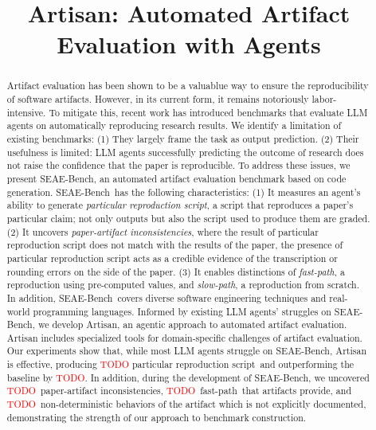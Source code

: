 \documentclass[acmsmall,screen,review,anonymous]{acmart}
\begin{document}
\newcommand\benchmark{SEAE-Bench}
\newcommand\approach{Artisan}

\newcommand\goodscript{particular reproduction script}
\newcommand\newbug{paper-artifact inconsistencies}
\newcommand\fastpath{fast-path}
\newcommand\slowpath{slow-path}

\newcommand\papersetsize{28}
\newcommand\tablesetsize{101} 

\newcommand\todo[1]{\textcolor{red}{TODO: #1}}
\newcommand\evalgoodscript{\textcolor{red}{TODO}}
\newcommand\evalgoodscriptoutperform{\textcolor{red}{TODO}}
\newcommand\nondetsize{\textcolor{red}{TODO}}
\newcommand\inconsistenciessize{\textcolor{red}{TODO}}
\newcommand\fastpathsize{\textcolor{red}{TODO}}

\title{Artisan: Automated Artifact Evaluation with Agents}
\begin{abstract}
Artifact evaluation has been shown to be a valuablue way to ensure the reproducibility of software artifacts.
However, in its current form, it remains notoriously labor-intensive.
To mitigate this, recent work has introduced benchmarks that evaluate LLM agents on automatically reproducing research results.
We identify a limitation of existing benchmarks:
(1) They largely frame the task as output prediction.
(2) Their usefulness is limited: LLM agents successfully predicting the outcome of research does not raise the confidence that the paper is reproducible.
To address these issues, we present \benchmark, an automated artifact evaluation benchmark based on code generation.
\benchmark~has the following characteristics:
(1) It measures an agent’s ability to generate \emph{\goodscript{}}, a script that reproduces a paper’s particular claim; not only outputs but also the script used to produce them are graded.
(2) It uncovers \emph{\newbug{}}, where the result of \goodscript{} does not match with the results of the paper, the presence of \goodscript{} acts as a credible evidence of the transcription or rounding errors on the side of the paper.
(3) It enables distinctions of \emph{\fastpath{}}, a reproduction using pre-computed values, and \emph{\slowpath{}}, a reproduction from scratch.
In addition, \benchmark~covers diverse software engineering techniques and real-world programming languages.
Informed by existing LLM agents’ struggles on \benchmark, we develop Artisan, an agentic approach to automated artifact evaluation.
Artisan includes specialized tools for domain-specific challenges of artifact evaluation.
Our experiments show that, while most LLM agents struggle on \benchmark, Artisan is effective, producing \evalgoodscript{} \goodscript{}~and outperforming the baseline by \evalgoodscriptoutperform{}.
In addition, during the development of \benchmark, we uncovered \inconsistenciessize~\newbug{}, \fastpathsize~\fastpath{}~that artifacts provide, and \nondetsize~non-deterministic behaviors of the artifact which is not explicitly documented, demonstrating the strength of our approach to benchmark construction.
\end{abstract}
\maketitle










\end{document}
